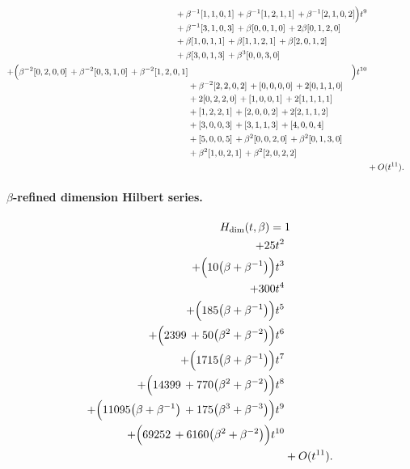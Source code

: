 \documentclass[10pt]{article}
\begin{document}
\[\begin{aligned}
\begin{aligned}[t]
  &{}+\beta^{-1}[1,1,0,1]\,+\beta^{-1}[1,2,1,1]\,+\beta^{-1}[2,1,0,2] \\
  &{}+\beta^{-1}[3,1,0,3]\,+\beta[0,0,1,0]\,+2\beta[0,1,2,0] \\
  &{}+\beta[1,0,1,1]\,+\beta[1,1,2,1]\,+\beta[2,0,1,2] \\
  &{}+\beta[3,0,1,3]\,+\beta^{3}[0,0,3,0]\end{aligned}\Bigr)t^{9} \\
  + \Bigl(\begin{aligned}[t]\beta^{-2}[0,2,0,0]\,+\beta^{-2}[0,3,1,0]\,+\beta^{-2}[1,2,0,1] \\
  &{}+\beta^{-2}[2,2,0,2]\,+[0,0,0,0]\,+2[0,1,1,0] \\
  &{}+2[0,2,2,0]\,+[1,0,0,1]\,+2[1,1,1,1] \\
  &{}+[1,2,2,1]\,+[2,0,0,2]\,+2[2,1,1,2] \\
  &{}+[3,0,0,3]\,+[3,1,1,3]\,+[4,0,0,4] \\
  &{}+[5,0,0,5]\,+\beta^{2}[0,0,2,0]\,+\beta^{2}[0,1,3,0] \\
  &{}+\beta^{2}[1,0,2,1]\,+\beta^{2}[2,0,2,2]\end{aligned}\Bigr)t^{10} \\
  &+ O(t^{11}).
\end{aligned}
\]
\paragraph{$\beta$-refined dimension Hilbert series.}
\[
\begin{aligned}
H_{\mathrm{dim}}(t,\beta) ={}&
   1 \\
  + 25t^{2} \\
  + \Bigl(10\bigl(\beta+\beta^{-1}\bigr)\Bigr)t^{3} \\
  + 300t^{4} \\
  + \Bigl(185\bigl(\beta+\beta^{-1}\bigr)\Bigr)t^{5} \\
  + \Bigl(2399\,+50\bigl(\beta^{2}+\beta^{-2}\bigr)\Bigr)t^{6} \\
  + \Bigl(1715\bigl(\beta+\beta^{-1}\bigr)\Bigr)t^{7} \\
  + \Bigl(14399\,+770\bigl(\beta^{2}+\beta^{-2}\bigr)\Bigr)t^{8} \\
  + \Bigl(11095\bigl(\beta+\beta^{-1}\bigr)\,+175\bigl(\beta^{3}+\beta^{-3}\bigr)\Bigr)t^{9} \\
  + \Bigl(69252\,+6160\bigl(\beta^{2}+\beta^{-2}\bigr)\Bigr)t^{10} \\
  &+ O(t^{11}).
\end{aligned}
\]
\end{document}
